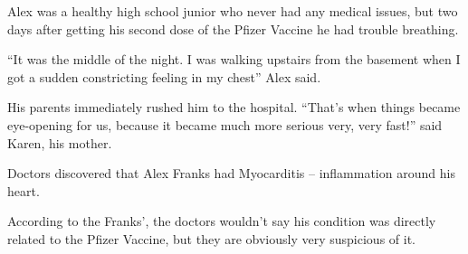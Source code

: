 Alex was a healthy high school junior who never had any medical issues, but two
days after getting his second dose of the Pfizer Vaccine he had trouble
breathing.

“It was the middle of the night. I was walking upstairs from the basement when I
got a sudden constricting feeling in my chest” Alex said.

His parents immediately rushed him to the hospital. “That’s when things became
eye-opening for us, because it became much more serious very, very fast!” said
Karen, his mother.

Doctors discovered that Alex Franks had Myocarditis – inflammation around his
heart.

According to the Franks’, the doctors wouldn’t say his condition was directly
related to the Pfizer Vaccine, but they are obviously very suspicious of it.
